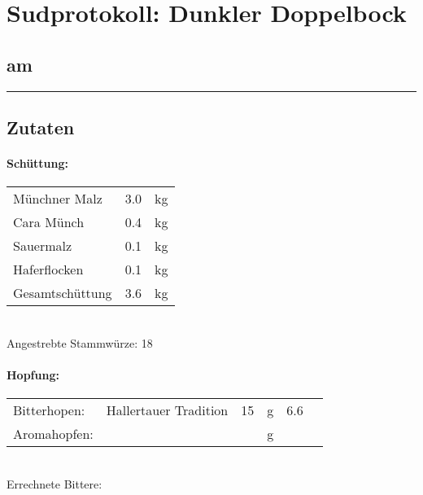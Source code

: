 \documentclass[12pt,oneside,a4paper]{scrartcl}
\begin{document}
	\begin{minipage}[c]{0.70\textwidth}
		\section*{\hspace{-.4cm}Sudprotokoll: Dunkler Doppelbock}
	\end{minipage}
	\begin{minipage}[c]{0.29\textwidth}
		\subsection*{am }
	\end{minipage}
	\rule{\textwidth}{1pt}
%
\subsection*{Zutaten}
%
\paragraph{Schüttung:}
	\begin{tabular}[t]{m{8cm} m{2cm} m{1cm}}
		Münchner Malz & \num{3,0} & \si{\kilogram} \bigstrut\\
		Cara Münch & \num{0,4} & \si{\kilogram} \bigstrut\\
		Sauermalz & \num{0,1} & \si{\kilogram} \bigstrut\\
		Haferflocken & \num{0,1} & \si{\kilogram} \bigstrut\\\hline\hline
		Gesamtschüttung & \num{3,6} & \si{\kilogram} \bigstrut
	\end{tabular}\\

\vspace{.25cm}
\hspace{1cm}Angestrebte Stammwürze: \SI{18}{\plato}
%
\paragraph{Hopfung:}
	\begin{tabular}[t]{m{2.5cm} m{5cm} m{0.5cm} m{1cm} m{0.5cm} m{1cm}}
		Bitterhopen: & Hallertauer Tradition & \num{15} & \si{\gram} & \num{6,6} & \si{\peralpha} \\
		Aromahopfen: &  &\num{} & \si{\gram} & \num{} &  \si{\peralpha}
	\end{tabular}\\

\vspace{.25cm}
\hspace{1cm}Errechnete Bittere: \SI{}{\ibu}
%
\end{document}
